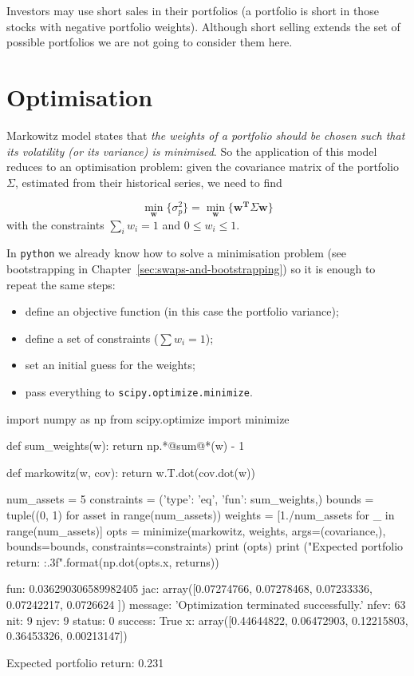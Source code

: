 Investors may use short sales in their portfolios (a portfolio is short in those stocks with negative portfolio weights). 
Although short selling extends the set of possible portfolios we are not going to consider them here.

\section{Optimisation}\label{optimization}

Markowitz model states that \emph{the weights of a portfolio should be chosen 
such that its volatility (or its variance) is minimised}. 
So the application of this model reduces to
an optimisation problem: given the covariance matrix of the portfolio
$\Sigma$, estimated from their historical series, we need to find

\begin{equation}
	\underset{\mathbf{w}}{\min}\{\sigma_p^2\} = \underset{\mathbf{w}}{\min}\{\mathbf{w^T}\Sigma\mathbf{w}\}
\end{equation}
with the constraints \(\sum_{i}w_i = 1\) and \(0 \le w_i \le 1\).

In \texttt{python} we already know how to solve a minimisation problem
(see bootstrapping in Chapter~\ref{sec:swaps-and-bootstrapping}) 
so it is enough to repeat the same steps:

\begin{itemize}
\tightlist
\item
  define an objective function (in this case the portfolio variance);
\item
  define a set of constraints ($\sum w_i = 1$);
\item
  set an initial guess for the weights;
\item
  pass everything to \texttt{scipy.optimize.minimize}.
\end{itemize}

\begin{ipython}
import numpy as np
from scipy.optimize import minimize

def sum_weights(w):
    return np.*@sum@*(w) - 1

def markowitz(w, cov):
    return w.T.dot(cov.dot(w))

num_assets = 5
constraints = ({'type': 'eq', 'fun': sum_weights},)
bounds = tuple((0, 1) for asset in range(num_assets))
weights = [1./num_assets for _ in range(num_assets)]
opts = minimize(markowitz, weights, args=(covariance,),
                bounds=bounds, constraints=constraints)
print (opts)
print ("Expected portfolio return: {:.3f}".format(np.dot(opts.x, returns))
\end{ipython}
\begin{ioutput}
    fun: 0.036290306589982405
    jac: array([0.07274766, 0.07278468, 0.07233336, 0.07242217, 0.0726624 ])
message: 'Optimization terminated successfully.'
   nfev: 63
    nit: 9
   njev: 9
 status: 0
success: True
x: array([0.44644822, 0.06472903, 0.12215803, 0.36453326, 0.00213147])

Expected portfolio return: 0.231
\end{ioutput}

